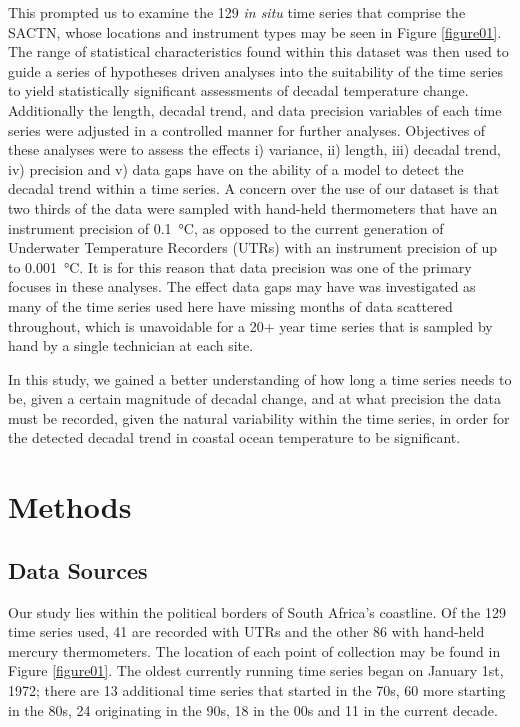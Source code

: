 \documentclass{ametsoc}
\begin{document}
This prompted us to examine the 129 \emph{in situ} time series that comprise the SACTN, whose locations and instrument types may be seen in Figure \ref{figure01}. The range of statistical characteristics found within this dataset was then used to guide a series of hypotheses driven analyses into the suitability of the time series to yield statistically significant assessments of decadal temperature change. Additionally the length, decadal trend, and data precision variables of each time series were adjusted in a controlled manner for further analyses. Objectives of these analyses were to assess the effects i) variance, ii) length, iii) decadal trend, iv) precision and v) data gaps have on the ability of a model to detect the decadal trend within a time series. A concern over the use of our dataset is that two thirds of the data were sampled with hand-held thermometers that have an instrument precision of \SI{0.1}{\degreeCelsius}, as opposed to the current generation of Underwater Temperature Recorders (UTRs) with an instrument precision of up to \SI{0.001}{\degreeCelsius}. It is for this reason that data precision was one of the primary focuses in these analyses. The effect data gaps may have was investigated as many of the time series used here have missing months of data scattered throughout, which is unavoidable for a 20+ year time series that is sampled by hand by a single technician at each site.

In this study, we gained a better understanding of how long a time series needs to be, given a certain magnitude of decadal change, and at what precision the data must be recorded, given the natural variability within the time series, in order for the detected decadal trend in coastal ocean temperature to be significant.

\section{Methods}

\subsection{Data Sources}
Our study lies within the political borders of South Africa's coastline. Of the 129 time series used, 41 are recorded with UTRs and the other 86 with hand-held mercury thermometers. The location of each point of collection may be found in Figure \ref{figure01}. The oldest currently running time series began on January 1st, 1972; there are 13 additional time series that started in the 70s, 60 more starting in the 80s, 24 originating in the 90s, 18 in the 00s and 11 in the current decade.
\end{document}
